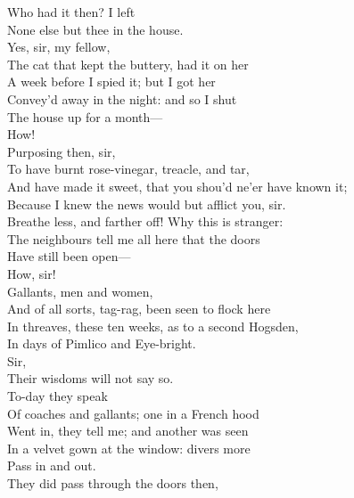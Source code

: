 \documentclass[a4paper,oneside]{memoir}
\begin{document}
\begin{drama*}
\lovewitspeaks {} Who had it then? I left\\
None else but thee in the house.\\
\facespeaks {} Yes, sir, my fellow,\\
The cat that kept the buttery, had it on her\\
A week before I spied it; but I got her\\
Convey'd away in the night: and so I shut\\
The house up for a month---\\
\lovewitspeaks {} How!\\
\facespeaks {} Purposing then, sir,\\
To have burnt rose-vinegar, treacle, and tar,\\
And have made it sweet, that you shou'd ne'er have known it;\\
Because I knew the news would but afflict you, sir.\\
\lovewitspeaks Breathe less, and farther off! Why this is stranger:\\
The neighbours tell me all here that the doors\\
Have still been open---\\
\facespeaks {} How, sir!\\
\lovewitspeaks {} Gallants, men and women,\\
And of all sorts, tag-rag, been seen to flock here\\
In threaves, these ten weeks, as to a second Hogsden,\\
In days of Pimlico and Eye-bright.\\
\facespeaks {} Sir,\\
Their wisdoms will not say so.\\
\lovewitspeaks {} To-day they speak\\
Of coaches and gallants; one in a French hood\\
Went in, they tell me; and another was seen\\
In a velvet gown at the window: divers more\\
Pass in and out.\\
\facespeaks {} They did pass through the doors then,\\

\end{drama*}
\end{document}
